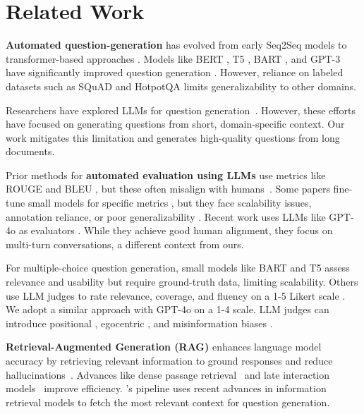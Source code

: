 \section{Related Work}
\label{sec:related-work}

\textbf{Automated question-generation} has evolved from early Seq2Seq models \cite{du-etal-2017-learning, Neural_QG} to transformer-based approaches \cite{attention_is_all_you_need}. Models like BERT \cite{devlin-etal-2019-bert}, T5 \cite{t5}, BART \cite{lewis-etal-2020-bart}, and GPT-3 \cite{gpt_3} have significantly improved question generation \cite{chan-fan-2019-bert, li-etal-2021-addressing-semantic}. However, reliance on labeled datasets such as SQuAD \cite{rajpurkar-etal-2016-squad} and HotpotQA \cite{yang-etal-2018-hotpotqa} limits generalizability to other domains.

Researchers have explored LLMs for question generation~\cite{knowledge_base_prompting, reading_comprehension_language_llm, code_QG, mcq_computing, MIT_law}. However, these efforts have focused on generating questions from short, domain-specific context. Our work mitigates this limitation and generates high-quality questions from long documents.


Prior methods for \textbf{automated evaluation using LLMs} use metrics like ROUGE \cite{lin-2004-rouge} and BLEU \cite{papineni-etal-2002-bleu}, but these often misalign with humans~\cite{guo2024survey-neural-question-gen}. Some papers fine-tune small models for specific metrics \cite{zhu2023judgelm, wang2024pandalm}, but they face scalability issues, annotation reliance, or poor generalizability \cite{zhu2023judgelm}. Recent work uses  LLMs like GPT-4o as evaluators \cite{zheng2023judging, lin2023llmevalunifiedmultidimensionalautomatic}. While they achieve good human alignment, they focus on multi-turn conversations, a different context from ours.

For multiple-choice question generation, small models like BART and T5 assess relevance and usability \cite{moon-etal-2024-generative, raina2022multiplechoicequestiongenerationautomated} but require ground-truth data, limiting scalability. Others use LLM judges to rate relevance, coverage, and fluency on a 1-5 Likert scale \cite{microsoft_agriculture}. 
We adopt a similar approach with GPT-4o on a 1-4 scale. 
LLM judges can introduce positional \cite{zheng2024large, wang-etal-2024-large-language-models-fair}, egocentric \cite{koo-etal-2024-benchmarking}, and misinformation biases \cite{chen-etal-2024-humans, koo-etal-2024-benchmarking}.


\textbf{Retrieval-Augmented Generation (RAG)} enhances language model accuracy by retrieving relevant information to ground responses and reduce hallucinations~\cite{lewis2020retrieval, shuster2021retrieval, colbertv2, gottumukkala2022investigating}. Advances like dense passage retrieval~\cite{karpukhin2020dense} and late interaction models~\cite{colbert} improve efficiency. \name's pipeline uses recent advances in information retrieval models to fetch the most relevant context for question generation.
